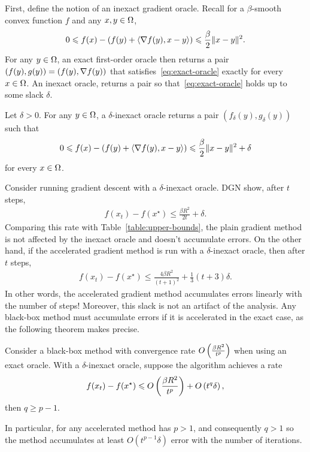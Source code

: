 First, define the notion of an inexact gradient oracle. Recall for a
$\beta$-smooth convex function $f$ and any $x, y \in \Omega$,
\begin{align}
    0 \leqslant f(x)  - \left(f(y) + \langle \nabla f(y), x - y \rangle \right )
    \leqslant \frac{\beta}{2} \lVert x-y\rVert^2. \label{eq:exact-oracle}
\end{align}
For any $y \in \Omega$, an exact first-order oracle then returns a pair
$(f(y), g(y)) = (f(y), \nabla f(y))$ that satisfies~\eqref{eq:exact-oracle}
exactly for every $x \in \Omega$. 
An inexact oracle, returns a pair so that~\eqref{eq:exact-oracle} holds up to some
slack $\delta$.
~
\begin{definition}
Let $\delta > 0$. For any $y\in \Omega$, a $\delta$-inexact oracle returns a pair
$(f_\delta(y), g_\delta(y))$ such that
\begin{align*}
    0 \leqslant f(x)  - \left(f(y) + \langle \nabla f(y), x - y \rangle \right )
    \leqslant \frac{\beta}{2} \lVert x-y\rVert^2 + \delta
\end{align*}
for every $x \in \Omega$.
\end{definition}
Consider running gradient descent with a $\delta$-inexact oracle.
DGN \cite{devolder2014first} show, after $t$ steps,
\begin{align*}
    f(x_t) - f(x^\star) \leq \frac{\beta R^2}{2t} + \delta.
\end{align*}
Comparing this rate with Table~\eqref{table:upper-bounds}, the plain gradient
method is not affected by the inexact oracle and doesn't accumulate errors. 
On the other hand, if the accelerated gradient
method is run with a $\delta$-inexact oracle, then after $t$ steps,
\begin{align*}
    f(x_t) - f(x^\star)  \leq \frac{4 \beta R^2}{(t+1)^2} +
    \frac{1}{3}(t+3)\delta.
\end{align*}
In other words, the accelerated gradient method accumulates errors linearly with
the number of steps! Moreover, this slack is not an artifact of the analysis.
Any black-box method must accumulate errors if it is accelerated in the exact
case, as the following theorem makes precise.
\begin{theorem}
Consider a black-box method with convergence rate $O\left(\frac{\beta R^2}{t^p} \right )$
when using an exact oracle. With a $\delta$-inexact oracle, suppose the
algorithm achieves a rate
\begin{align}
    f(x_t) - f(x^\star) \leqslant O\left(\frac{\beta R^2}{t^p} \right ) + O\left(t^q \delta \right ),
\end{align}
then $q \geq p-1$.
\end{theorem}
In particular, for any accelerated method has $p > 1$, and consequently $q > 1$
so the method accumulates at least $O(t^{p-1} \delta)$ error with the number of
iterations. 
